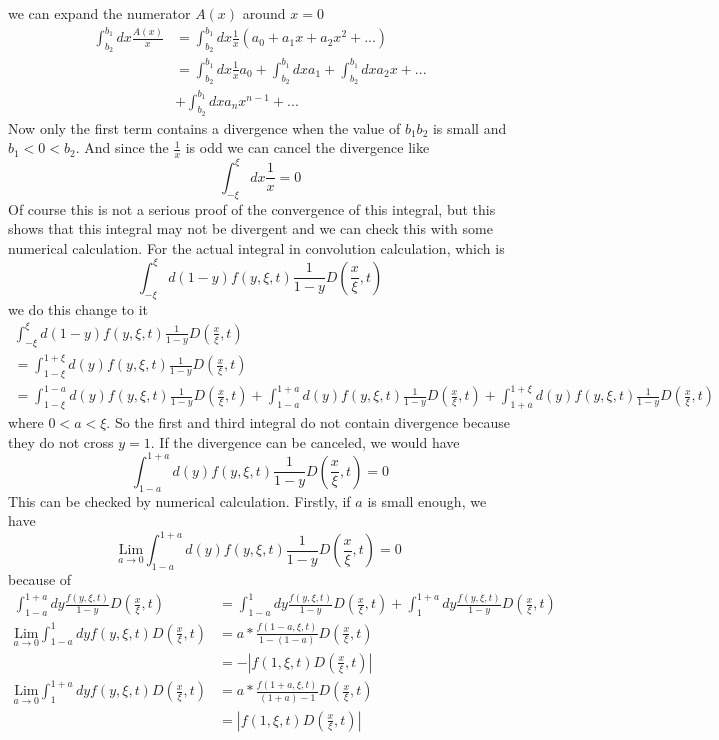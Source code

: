 \documentclass[preprintnumbers,prd,superscriptaddress,preprint]{revtex4-1}
\begin{document}
	we can expand the numerator $A(x)$ around $x=0$ 
	\begin{align*}
		\int_{b_{2}}^{b_{1}}dx\frac{A(x)}{x} & =\int_{b_{2}}^{b_{1}}dx\frac{1}{x}(a_{0}+a_{1}x+a_{2}x^{2}+...)\\
		& =\int_{b_{2}}^{b_{1}}dx\frac{1}{x}a_{0}+\int_{b_{2}}^{b_{1}}dxa_{1}+\int_{b_{2}}^{b_{1}}dxa_{2}x+...\\
		& +\int_{b_{2}}^{b_{1}}dxa_{n}x^{n-1}+...
	\end{align*} 
	Now only the first term contains a divergence when the value of $b_{1}b_{2}$ is small and  $b_{1}<0<b_{2}$. And since the $\frac{1}{x}$ is odd we can cancel the divergence like 
	\[
	\int_{-\xi}^{\xi}dx\frac{1}{x}=0
	\]
	Of course this is not a serious proof of the convergence of this integral, but this shows that this integral may not be divergent and we can check this with some numerical calculation.
	For the actual integral in convolution calculation, which is 
	\[
	\int_{-\xi}^{\xi}d(1-y)f(y,\xi,t)\frac{1}{1-y}D(\frac{x}{\xi},t)
	\]
	we do this change to it
	\begin{gather*}
		\int_{-\xi}^{\xi}d(1-y)f(y,\xi,t)\frac{1}{1-y}D(\frac{x}{\xi},t)\\
		=\int_{1-\xi}^{1+\xi}d(y)f(y,\xi,t)\frac{1}{1-y}D(\frac{x}{\xi},t)\\
		=\int_{1-\xi}^{1-a}d(y)f(y,\xi,t)\frac{1}{1-y}D(\frac{x}{\xi},t)+\int_{1-a}^{1+a}d(y)f(y,\xi,t)\frac{1}{1-y}D(\frac{x}{\xi},t)+\int_{1+a}^{1+\xi}d(y)f(y,\xi,t)\frac{1}{1-y}D(\frac{x}{\xi},t)
	\end{gather*}
	where $0<a<\xi$. So the first and third integral do not contain divergence because they do not cross $y=1$. If the divergence can be canceled, we would have \[
	\int_{1-a}^{1+a}d(y)f(y,\xi,t)\frac{1}{1-y}D(\frac{x}{\xi},t)=0
	\]
	This can be checked by numerical calculation. Firstly, if $a$ is small enough, we have \[
	\underset{a\rightarrow0}{\textrm{Lim}}\int_{1-a}^{1+a}d(y)f(y,\xi,t)\frac{1}{1-y}D(\frac{x}{\xi},t)=0\] because of
	\begin{align*}
		\int_{1-a}^{1+a}dy\frac{f(y,\xi,t)}{1-y}D(\frac{x}{\xi},t) & =\int_{1-a}^{1}dy\frac{f(y,\xi,t)}{1-y}D(\frac{x}{\xi},t)+\int_{1}^{1+a}dy\frac{f(y,\xi,t)}{1-y}D(\frac{x}{\xi},t)\\
		\underset{a\rightarrow0}{\textrm{Lim}}\int_{1-a}^{1}dyf(y,\xi,t)D(\frac{x}{\xi},t) & =a*\frac{f(1-a,\xi,t)}{1-(1-a)}D(\frac{x}{\xi},t)\\
		& =-|f(1,\xi,t)D(\frac{x}{\xi},t)|\\
		\underset{a\rightarrow0}{\textrm{Lim}}\int_{1}^{1+a}dyf(y,\xi,t)D(\frac{x}{\xi},t) & =a*\frac{f(1+a,\xi,t)}{(1+a)-1}D(\frac{x}{\xi},t)\\
		& =|f(1,\xi,t)D(\frac{x}{\xi},t)|
	\end{align*}
\end{document}

